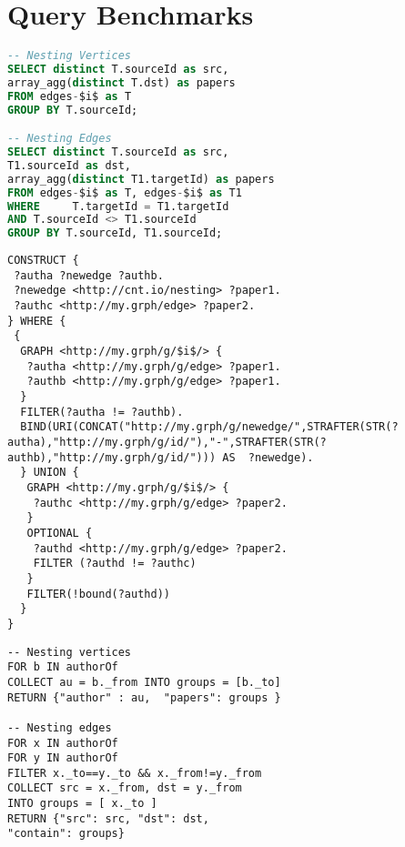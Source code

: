 \section{Query Benchmarks}
\begin{lstlisting}[caption={Graph Nesting in PostgreSQL's SQL dialect. Two distinct tables are created for both vertices and edges. },language=SQL,frameround=fttt,frame=trBL,mathescape=true,label=SQLNesting]
-- Nesting Vertices
SELECT distinct T.sourceId as src, 
array_agg(distinct T.dst) as papers 
FROM edges-$i$ as T 
GROUP BY T.sourceId;

-- Nesting Edges
SELECT distinct T.sourceId as src, 
T1.sourceId as dst, 
array_agg(distinct T1.targetId) as papers
FROM edges-$i$ as T, edges-$i$ as T1 
WHERE     T.targetId = T1.targetId 
AND T.sourceId <> T1.sourceId 
GROUP BY T.sourceId, T1.sourceId;
\end{lstlisting}


\begin{lstlisting}[caption={Graph Nesting in SPARQL. We use properties to associate to either vertices and edges the nesting content.},language=SPARQL,frameround=fttt,frame=trBL,tabsize=2,mathescape=true,label=SPARQLNesting]
CONSTRUCT {
 ?autha ?newedge ?authb.
 ?newedge <http://cnt.io/nesting> ?paper1.
 ?authc <http://my.grph/edge> ?paper2.
} WHERE {
 {
  GRAPH <http://my.grph/g/$i$/> {
   ?autha <http://my.grph/g/edge> ?paper1.
   ?authb <http://my.grph/g/edge> ?paper1.
  }
  FILTER(?autha != ?authb).
  BIND(URI(CONCAT("http://my.grph/g/newedge/",STRAFTER(STR(?autha),"http://my.grph/g/id/"),"-",STRAFTER(STR(?authb),"http://my.grph/g/id/"))) AS  ?newedge).
  } UNION {
   GRAPH <http://my.grph/g/$i$/> {
    ?authc <http://my.grph/g/edge> ?paper2. 
   }
   OPTIONAL {
    ?authd <http://my.grph/g/edge> ?paper2.
    FILTER (?authd != ?authc)
   }
   FILTER(!bound(?authd))
  }
}
\end{lstlisting}

\begin{lstlisting}[caption={Graph Nesting in ArangoDB using AQL. All the fields marked with an underscore represent externally indexed structures.},language=AQL,frameround=fttt,frame=trBL,tabsize=2,mathescape=true,label=AQLQueryNesting]
-- Nesting vertices
FOR b IN authorOf 
COLLECT au = b._from INTO groups = [b._to] 
RETURN {"author" : au,  "papers": groups }

-- Nesting edges
FOR x IN authorOf 
FOR y IN authorOf 
FILTER x._to==y._to && x._from!=y._from 
COLLECT src = x._from, dst = y._from 
INTO groups = [ x._to ] 
RETURN {"src": src, "dst": dst, 
"contain": groups}
\end{lstlisting}

